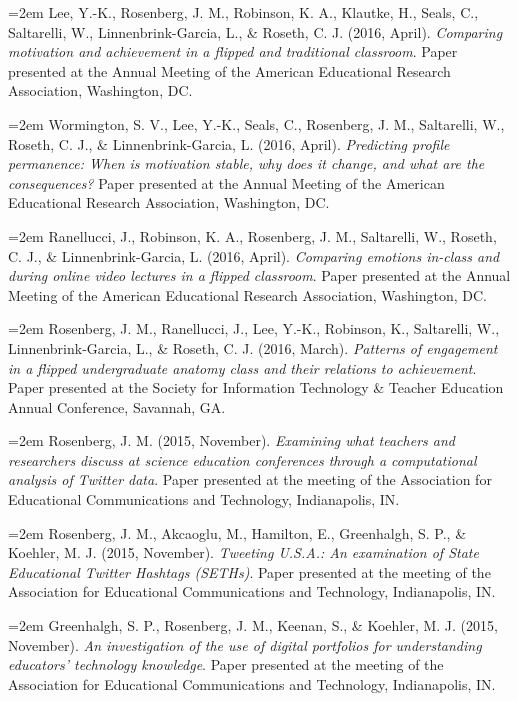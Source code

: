 \documentclass[14,]{article}
\begin{document}
\hangindent=2em Lee, Y.-K., Rosenberg, J. M., Robinson, K. A., Klautke,
H., Seals, C., Saltarelli, W., Linnenbrink-Garcia, L., \& Roseth, C. J.
(2016, April). \emph{Comparing motivation and achievement in a flipped
and traditional classroom}. Paper presented at the Annual Meeting of the
American Educational Research Association, Washington, DC.

\hangindent=2em Wormington, S. V., Lee, Y.-K., Seals, C., Rosenberg, J.
M., Saltarelli, W., Roseth, C. J., \& Linnenbrink-Garcia, L. (2016,
April). \emph{Predicting profile permanence: When is motivation stable,
why does it change, and what are the consequences?} Paper presented at
the Annual Meeting of the American Educational Research Association,
Washington, DC.

\hangindent=2em Ranellucci, J., Robinson, K. A., Rosenberg, J. M.,
Saltarelli, W., Roseth, C. J., \& Linnenbrink-Garcia, L. (2016, April).
\emph{Comparing emotions in-class and during online video lectures in a
flipped classroom}. Paper presented at the Annual Meeting of the
American Educational Research Association, Washington, DC.

\hangindent=2em Rosenberg, J. M., Ranellucci, J., Lee, Y.-K., Robinson,
K., Saltarelli, W., Linnenbrink-Garcia, L., \& Roseth, C. J. (2016,
March). \emph{Patterns of engagement in a flipped undergraduate anatomy
class and their relations to achievement}. Paper presented at the
Society for Information Technology \& Teacher Education Annual
Conference, Savannah, GA.

\hangindent=2em Rosenberg, J. M. (2015, November). \emph{Examining what
teachers and researchers discuss at science education conferences
through a computational analysis of Twitter data}. Paper presented at
the meeting of the Association for Educational Communications and
Technology, Indianapolis, IN.

\hangindent=2em Rosenberg, J. M., Akcaoglu, M., Hamilton, E.,
Greenhalgh, S. P., \& Koehler, M. J. (2015, November). \emph{Tweeting
U.S.A.: An examination of State Educational Twitter Hashtags (SETHs)}.
Paper presented at the meeting of the Association for Educational
Communications and Technology, Indianapolis, IN.

\hangindent=2em Greenhalgh, S. P., Rosenberg, J. M., Keenan, S., \&
Koehler, M. J. (2015, November). \emph{An investigation of the use of
digital portfolios for understanding educators' technology knowledge}.
Paper presented at the meeting of the Association for Educational
Communications and Technology, Indianapolis, IN.
\end{document}
